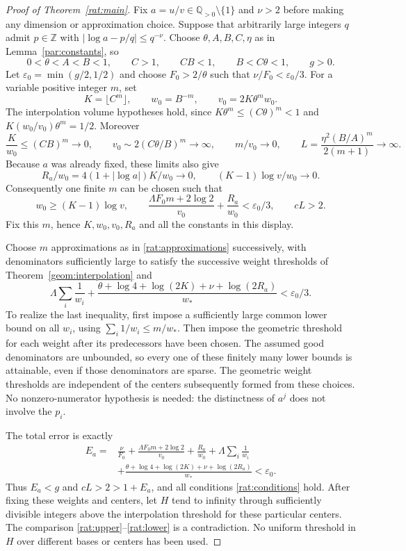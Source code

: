 \documentclass[11pt]{article}
\newcommand{\QQ}{\mathbb Q}
\newcommand{\ZZ}{\mathbb Z}
\theoremstyle{definition}
\theoremstyle{remark}
\numberwithin{equation}{section}
\begin{document}
\begin{proof}[Proof of Theorem~\ref{rat:main}]
Fix $a=u/v\in\QQ_{>0}\setminus\{1\}$ and $\nu>2$ before making any
dimension or approximation choice.  Suppose that arbitrarily large
integers $q$ admit $p\in\ZZ$ with $|\log a-p/q|\le q^{-\nu}$.
Choose $\theta,A,B,C,\eta$ as in Lemma~\ref{par:constants}, so
\[
 0<\theta<A<B<1,\qquad C>1,\qquad CB<1,\qquad B<C\theta<1,
 \qquad g>0.
\]
Let $\varepsilon_0=\min(g/2,1/2)$ and choose $F_0>2/\theta$ such that
$\nu/F_0<\varepsilon_0/3$.
For a variable positive integer $m$, set
\[
 K=\lfloor C^m\rfloor,\qquad w_0=B^{-m},\qquad
 v_0=2K\theta^m w_0.
\]
The interpolation volume hypotheses hold, since
$K\theta^m\le(C\theta)^m<1$ and
$K(w_0/v_0)\theta^m=1/2$.
Moreover
\[
 \frac{K}{w_0}\le(CB)^m\to0,\qquad
 v_0\sim2(C\theta/B)^m\to\infty,\qquad m/v_0\to0,
 \qquad
 L=\frac{\eta^2(B/A)^m}{2(m+1)}\to\infty.
\]
Because $a$ was already fixed, these limits also give
\[
 R_a/w_0=4(1+|\log a|)K/w_0\to0,\qquad
 (K-1)\log v/w_0\to0.
\]
Consequently one finite $m$ can be chosen such that
\begin{equation}
 w_0\ge(K-1)\log v,\qquad
 \frac{\Lambda F_0m+2\log2}{v_0}+\frac{R_a}{w_0}
       <\varepsilon_0/3,\qquad cL>2.
 \label{rat:dimension-margin}
\end{equation}
Fix this $m$, hence $K,w_0,v_0,R_a$ and all the constants in this display.

Choose $m$ approximations as in \eqref{rat:approximations}
successively, with denominators sufficiently large to satisfy the
successive weight thresholds of Theorem~\ref{geom:interpolation} and
\begin{equation}
 \Lambda\sum_i\frac1{w_i}
 +\frac{\theta+\log4+\log(2K)+\nu+\log(2R_a)}{w_*}
       <\varepsilon_0/3.
 \label{rat:weight-margin}
\end{equation}
To realize the last inequality, first impose a sufficiently large common
lower bound on all $w_i$, using $\sum_i1/w_i\le m/w_*$.
Then impose the geometric threshold for each weight after its predecessors
have been chosen.  The assumed good denominators are unbounded, so every
one of these finitely many lower bounds is attainable, even if those
denominators are sparse.  The geometric weight thresholds are independent
of the centers subsequently formed from these choices.
No nonzero-numerator hypothesis is needed: the distinctness of $a^j$
does not involve the $p_i$.

The total error is exactly
\[
\begin{aligned}
 E_a={}&\frac{\nu}{F_0}
  +\frac{\Lambda F_0m+2\log2}{v_0}+\frac{R_a}{w_0}
  +\Lambda\sum_i\frac1{w_i}\\
 &+\frac{\theta+\log4+\log(2K)+\nu+\log(2R_a)}{w_*}
 <\varepsilon_0.
\end{aligned}
\]
Thus $E_a<g$ and $cL>2>1+E_a$, and all conditions
\eqref{rat:conditions} hold.  After fixing these weights and centers,
let $H$ tend to infinity through sufficiently divisible integers above
the interpolation threshold for these particular centers.  The comparison
\eqref{rat:upper}--\eqref{rat:lower} is a contradiction.  No uniform
threshold in $H$ over different bases or centers has been used.


\end{proof}
\end{document}
